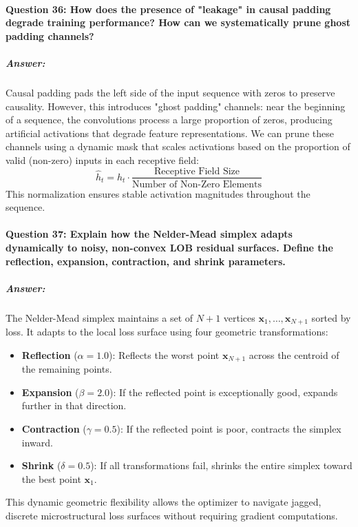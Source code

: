 \documentclass[11pt,a4paper]{article}
\begin{document}
\paragraph{Question 36: How does the presence of "leakage" in causal padding degrade training performance? How can we systematically prune ghost padding channels?}
\subparagraph{Answer:}
Causal padding pads the left side of the input sequence with zeros to preserve causality. However, this introduces "ghost padding" channels: near the beginning of a sequence, the convolutions process a large proportion of zeros, producing artificial activations that degrade feature representations. We can prune these channels using a dynamic mask that scales activations based on the proportion of valid (non-zero) inputs in each receptive field:
\begin{equation}
    \hat{h}_t = h_t \cdot \frac{\text{Receptive Field Size}}{\text{Number of Non-Zero Elements}}
\end{equation}
This normalization ensures stable activation magnitudes throughout the sequence.

\paragraph{Question 37: Explain how the Nelder-Mead simplex adapts dynamically to noisy, non-convex LOB residual surfaces. Define the reflection, expansion, contraction, and shrink parameters.}
\subparagraph{Answer:}
The Nelder-Mead simplex maintains a set of $N+1$ vertices $\mathbf{x}_1, \dots, \mathbf{x}_{N+1}$ sorted by loss. It adapts to the local loss surface using four geometric transformations:
\begin{itemize}
    \item \textbf{Reflection} ($\alpha = 1.0$): Reflects the worst point $\mathbf{x}_{N+1}$ across the centroid of the remaining points.
    \item \textbf{Expansion} ($\beta = 2.0$): If the reflected point is exceptionally good, expands further in that direction.
    \item \textbf{Contraction} ($\gamma = 0.5$): If the reflected point is poor, contracts the simplex inward.
    \item \textbf{Shrink} ($\delta = 0.5$): If all transformations fail, shrinks the entire simplex toward the best point $\mathbf{x}_1$.
\end{itemize}
This dynamic geometric flexibility allows the optimizer to navigate jagged, discrete microstructural loss surfaces without requiring gradient computations.
\end{document}

